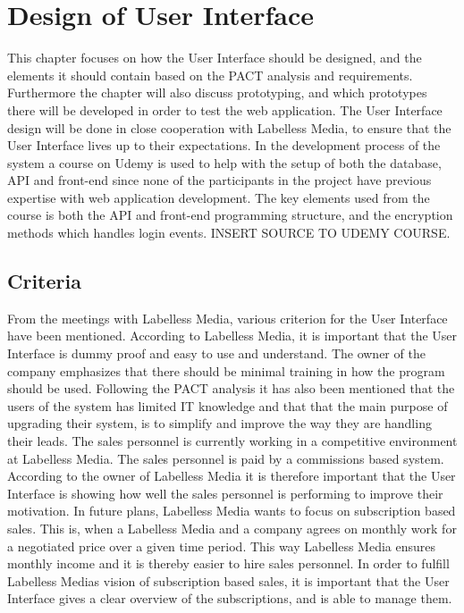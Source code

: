 \chapter{Design of User Interface}
This chapter focuses on how the User Interface should be designed, and the elements it should contain based on the PACT analysis and requirements. Furthermore the chapter will also discuss prototyping, and which prototypes there will be developed in order to test the web application. The User Interface design will be done in close cooperation with Labelless Media, to ensure that the User Interface lives up to their expectations. 
\newline\newline
\noindent
In the development process of the system a course on Udemy is used to help with the setup of both the database, API and front-end since none of the participants in the project have previous expertise with web application development. The key elements used from the course is both the API and front-end programming structure, and the encryption methods which handles login events. INSERT SOURCE TO UDEMY COURSE.

\section{Criteria}
From the meetings with Labelless Media, various criterion for the User Interface have been mentioned. According to Labelless Media, it is important that the User Interface is dummy proof and easy to use and understand. The owner of the company emphasizes that there should be minimal training in how the program should be used. Following the PACT analysis it has also been mentioned that the users of the system has limited IT knowledge and that that the main purpose of upgrading their system, is to simplify and improve the way they are handling their leads. 
\newline \newline
\noindent
The sales personnel is currently working in a competitive environment at Labelless Media. The sales personnel is paid by a commissions based system. According to the owner of Labelless Media it is therefore important that the User Interface is showing how well the sales personnel is performing to improve their motivation. In future plans, Labelless Media wants to focus on subscription based sales. This is, when a Labelless Media and a company agrees on monthly work for a negotiated price over a given time period. This way Labelless Media ensures monthly income and it is thereby easier to hire sales personnel. In order to fulfill Labelless Medias vision of subscription based sales, it is important that the User Interface gives a clear overview of the subscriptions, and is able to manage them.

